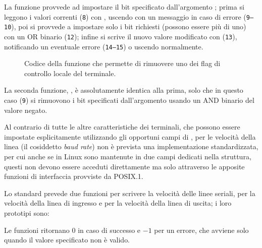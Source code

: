 La funzione  provvede ad impostare il bit specificato
dall'argomento ; prima si leggono i valori correnti
(\texttt{\small 8}) con , uscendo con un messaggio in caso di
errore (\texttt{\small 9--10}), poi si provvede a impostare solo i bit
richiesti (possono essere più di uno) con un OR binario (\texttt{\small 12});
infine si scrive il nuovo valore modificato con 
(\texttt{\small 13}), notificando un eventuale errore (\texttt{\small 14--15})
o uscendo normalmente.

\begin{figure}[!htbp]
  \footnotesize \centering
  \begin{minipage}[c]{\codesamplewidth}
  \end{minipage} 
  \normalsize 
  \caption{Codice della funzione  che permette di
    rimuovere uno dei flag di controllo locale del terminale.} 
  \label{fig:term_unset_attr}
\end{figure}

La seconda funzione, , è assolutamente identica alla
prima, solo che in questo caso (\texttt{\small 9}) si rimuovono i bit
specificati dall'argomento  usando un AND binario del valore
negato.

Al contrario di tutte le altre caratteristiche dei terminali, che possono
essere impostate esplicitamente utilizzando gli opportuni campi di
, per le velocità della linea (il cosiddetto \textit{baud
  rate}) non è prevista una implementazione standardizzata, per cui anche se
in Linux sono mantenute in due campi dedicati nella struttura, questi non
devono essere acceduti direttamente ma solo attraverso le apposite funzioni di
interfaccia provviste da POSIX.1.

Lo standard prevede due funzioni per scrivere la velocità delle linee seriali,
 per la velocità della linea di ingresso e
 per la velocità della linea di uscita; i loro prototipi
sono:

\begin{funcproto}{
}

{Le funzioni ritornano $0$ in caso di successo e $-1$ per un errore, che
  avviene solo quando il valore specificato non è valido.}
\end{funcproto}

